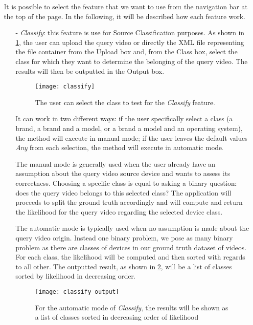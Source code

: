 It is possible to select the feature that we want to use from the navigation bar at the top of the page. In the following, it will be described how each feature work.

\begin{itemize}

\item[-] \emph{Classify}: this feature is use for Source Classification purposes. As shown in \ref{fig:classify}, the user can upload the query video or directly the XML file representing the file container from the Upload box and, from the Class box, select the class for which they want to determine the belonging of the query video. The results will then be outputted in the Output box. 

\begin{figure}
  \centering
  \texttt{[image: classify]}
  \caption{The user can select the class to test for the \emph{Classify} feature.}\label{fig:classify}
\end{figure}

It can work in two different ways: if the user specifically select a class (a brand, a brand and a model, or a brand a model and an operating system), the method will execute in manual mode; if the user leaves the default values \emph{Any} from each selection, the method will execute in automatic mode.

The manual mode is generally used when the user already have an assumption about the query video source device and wants to assess its correctness. Choosing a specific class is equal to asking a binary question: does the query video belongs to this selected class? The application will proceeds to split the ground truth accordingly and will compute and return the likelihood for the query video regarding the selected device class.

The automatic mode is typically used when no assumption is made about the query video origin. Instead one binary problem, we pose as many binary problem as there are classes of devices in our ground truth dataset of videos. For each class, the likelihood will be computed and then sorted with regards to all other. The outputted result, as shown in \ref{fig:classify-output}, will be a list of classes sorted by likelihood in decreasing order.

\begin{figure}
  \centering
  \texttt{[image: classify-output]}
  \caption{For the automatic mode of \emph{Classify}, the results will be shown as a list of classes sorted in decreasing order of likelihood}\label{fig:classify-output}
\end{figure}


\end{itemize}

